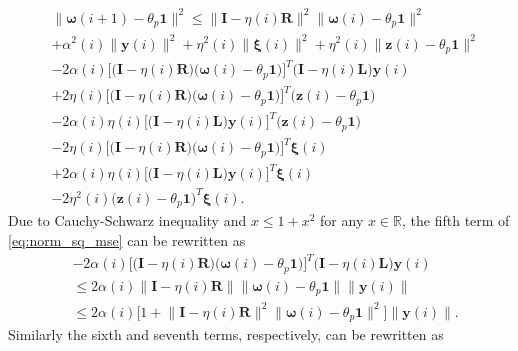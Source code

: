 \documentclass[journal]{IEEEtran}
\begin{document}
\vspace{-4mm}
\small
\begin{align}
&\Big\| \bm{\omega}(i+1) - \theta_p \mathbf{1}\Big\|^2 \le \Big\|\mathbf{I} - \eta(i)\mathbf{R}\Big\|^2  \Big\|\bm{\omega}(i)-\theta_p\mathbf{1}\Big\|^2 \nonumber \\
&+\alpha^2(i)\big\|\mathbf{y}(i)\big\|^2 + \eta^2(i)\big\|\bm{\xi}(i)\big\|^2 + \eta^2(i)\Big\|\mathbf{z}(i) - \theta_p\mathbf{1}\Big\|^2 \nonumber \\
&- 2\alpha(i)\bigg[\Big(\mathbf{I} - \eta(i)\mathbf{R} \Big)  \big(\bm{\omega}(i) - {\theta_p}\mathbf{1} \big)\bigg]^T \Big(\mathbf{I} - \eta(i) \mathbf{L}\Big) \mathbf{y}(i) \nonumber \\
&+ 2\eta(i)\bigg[\Big(\mathbf{I} - \eta(i)\mathbf{R} \Big)  \big(\bm{\omega}(i) - {\theta_p}\mathbf{1} \big)\bigg]^T \Big(\mathbf{z}(i)- {\theta_p}\mathbf{1} \Big) \nonumber \\
&-2 \alpha(i) \eta(i) \bigg[ \Big(\mathbf{I} - \eta(i) \mathbf{L}\Big)   \mathbf{y}(i)\bigg]^T \Big(\mathbf{z}(i)- {\theta_p}\mathbf{1} \Big)\nonumber \\
&- 2\eta(i)\bigg[\Big(\mathbf{I} - \eta(i)\mathbf{R} \Big)  \big(\bm{\omega}(i) - {\theta_p}\mathbf{1} \big)\bigg]^T \bm{\xi}(i) \nonumber \\
&+ 2 \alpha(i) \eta(i) \bigg[ \Big(\mathbf{I} - \eta(i) \mathbf{L}\Big)   \mathbf{y}(i)\bigg]^T \bm{\xi}(i) \nonumber \\
&-2 \eta^2(i)\Big(\mathbf{z}(i)- {\theta_p}\mathbf{1} \Big)^T \bm{\xi}(i). \label{eq:norm_sq_mse}
\end{align}
\normalsize
Due to Cauchy-Schwarz inequality and $x \le 1+x^2 $ for any $x \in \mathbb{R}$, the fifth term of \eqref{eq:norm_sq_mse} can be rewritten as 
\vspace{-4mm}
\small
\begin{align}
&- 2\alpha(i)\bigg[\Big(\mathbf{I} - \eta(i)\mathbf{R} \Big)  \big(\bm{\omega}(i) - {\theta_p}\mathbf{1} \big)\bigg]^T \Big(\mathbf{I} - \eta(i) \mathbf{L}\Big) \mathbf{y}(i) \nonumber \\
&\le 2\alpha(i)\Big\|\mathbf{I} - \eta(i)\mathbf{R}  \Big\| \Big\| \bm{\omega}(i) - {\theta_p}\mathbf{1} \Big\| \Big\|\mathbf{y}(i)\Big\| \nonumber \\
&\le 2\alpha(i)\bigg[ 1+ \Big\|\mathbf{I} - \eta(i)\mathbf{R}  \Big\|^2 \Big\| \bm{\omega}(i) - {\theta_p}\mathbf{1} \Big\|^2 \bigg]\Big\|\mathbf{y}(i)\Big\|. \label{eq:norm_sq_mse_cauchy_schwarz}
\end{align}
\normalsize
Similarly the sixth and seventh terms, respectively, can be rewritten as
\end{document}
